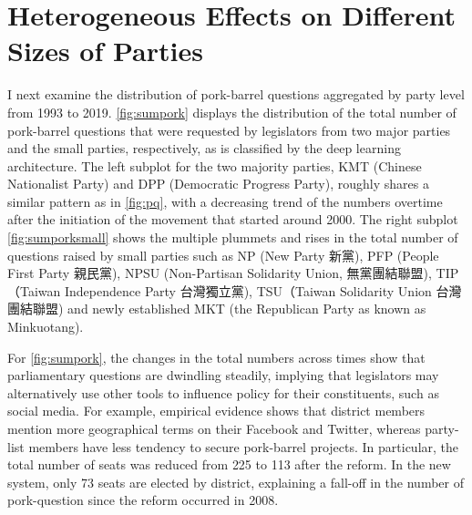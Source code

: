 


\section*{\centering Heterogeneous Effects on Different Sizes of Parties}

I next examine the distribution of pork-barrel questions aggregated by party level from 1993 to 2019. \autoref{fig:sumpork} displays the distribution of the total number of pork-barrel questions that were requested by legislators from two major parties and the small parties, respectively, as is classified by the deep learning architecture. The left subplot for the two majority parties, KMT (Chinese Nationalist Party) and DPP (Democratic Progress Party), roughly shares a similar pattern as in \autoref{fig:pq}, with a decreasing trend of the numbers overtime after the initiation of the movement that started around 2000. The right subplot \autoref{fig:sumporksmall} shows the multiple plummets and rises 
in the total number of questions raised by small parties such as NP (New Party 新黨), PFP (People First Party 親民黨), NPSU (Non-Partisan Solidarity Union, 無黨團結聯盟), TIP（Taiwan Independence Party 台灣獨立黨), TSU（Taiwan Solidarity Union 台灣團結聯盟) and newly established MKT (the Republican Party as known as Minkuotang).



For \autoref{fig:sumpork}, the changes in the total numbers across times show that parliamentary questions are dwindling steadily, implying that legislators may alternatively use other tools to influence policy for their constituents, such as social media. For example, empirical evidence shows that district members mention more geographical terms on their Facebook and Twitter, whereas party-list members have less tendency to secure pork-barrel projects. In particular, the total number of seats was reduced from 225  to 113 after the reform. In the new system, only  73 seats are elected by district, explaining a fall-off in the number of pork-question since the reform occurred in 2008.

